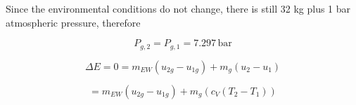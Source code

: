 Since the environmental conditions do not change, there is still 32 kg plus 1 bar atmospheric pressure, therefore

\[
P_{g,2} = P_{g,1} = 7.297 \, \text{bar}
\]

\[
\Delta E = 0 = m_{EW} (u_{2g} - u_{1g}) + m_g (u_2 - u_1)
\]

\[
= m_{EW} (u_{2g} - u_{1g}) + m_g (c_V (T_2 - T_1))
\]